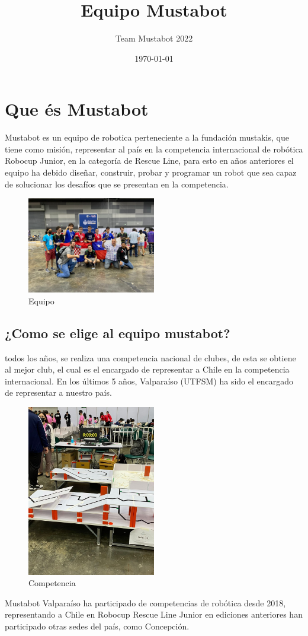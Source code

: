 \documentclass[12pt]{article}
\begin{document}
\title{Equipo Mustabot}
\author{Team Mustabot 2022}
\date{\today}

\maketitle
\section*{Que és Mustabot}
Mustabot es un equipo de robotica perteneciente a la fundación mustakis, que tiene como misión, representar al país en la competencia internacional de robótica
Robocup Junior, en la categoría de Rescue Line, para esto en años anteriores el equipo ha debido diseñar, construir, probar y programar un robot que sea capaz de
solucionar los desafíos que se presentan en la competencia.
\begin{figure}[H]
    \centering
    \includegraphics[width=0.5\textwidth]{imagenes_mustabot/competencia2.jpeg}
    \caption{Equipo}
    \label{fig:robot}
\end{figure}

\subsection*{¿Como se elige al equipo mustabot?}
todos los años, se realiza una competencia nacional de clubes, de esta se obtiene al mejor club, el cual es el encargado de representar a Chile
en la competencia internacional.
En los últimos 5 años, Valparaíso (UTFSM) ha sido el encargado de representar a nuestro país.
\begin{figure}[H]
    \centering
    \includegraphics[width=0.5\textwidth]{imagenes_mustabot/competencia.jpeg}
    \caption{Competencia}
    \label{fig:competencia}
\end{figure}

Mustabot Valparaíso ha participado de competencias de robótica desde 2018, representando a Chile en Robocup Rescue Line Junior
en ediciones anteriores han participado otras sedes del país, como Concepción.
\end{document}
